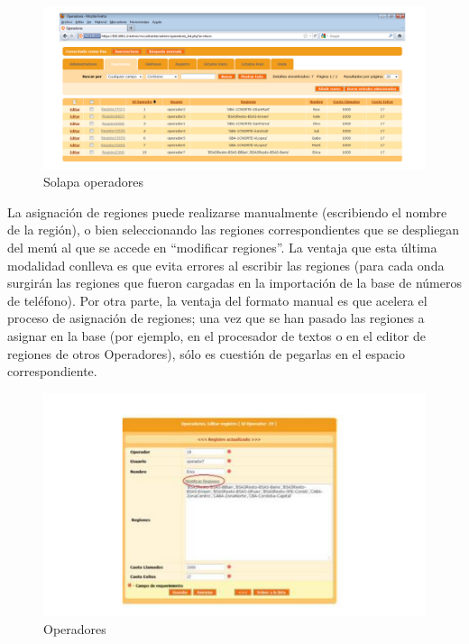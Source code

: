 \documentclass[
  openany]{book}
\begin{document}
\begin{figure}

{\centering \includegraphics[width=1\linewidth]{imagenes/figura6-03} 

}

\caption{Solapa operadores}\label{fig:Operadores}
\end{figure}

La asignación de regiones puede realizarse manualmente (escribiendo el nombre de la región), o bien seleccionando las regiones correspondientes que se despliegan del menú al que se accede en ``modificar regiones''. La ventaja que esta última modalidad conlleva es que evita errores al escribir las regiones (para cada onda surgirán las regiones que fueron cargadas en la importación de la base de números de teléfono). Por otra parte, la ventaja del formato manual es que acelera el proceso de asignación de regiones; una vez que se han pasado las regiones a asignar en la base (por ejemplo, en el procesador de textos o en el editor de regiones de otros Operadores), sólo es cuestión de pegarlas en el espacio correspondiente.

\begin{figure}

{\centering \includegraphics[width=1\linewidth]{imagenes/figura6-04} 

}

\caption{Operadores}\label{fig:Ope}
\end{figure}
\end{document}
